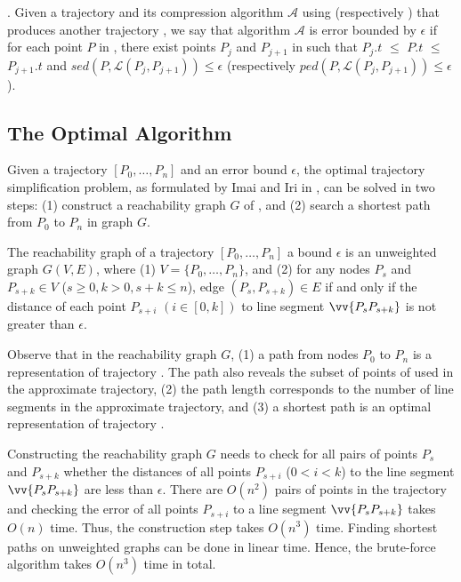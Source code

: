 . Given a trajectory  and its compression  algorithm $\mathcal{A}$ using \sed (respectively \ped) that produces another trajectory ,
we say that algorithm $\mathcal{A}$ is error bounded by $\epsilon$ if  for each point $P$ in , there exist points $P_j$ and $P_{j+1}$ in  such that $P_j.t$ $\le$ $P.t$ $\le$ $P_{j+1}.t$ and $sed(P, \mathcal{L}(P_j,P_{j+1}))\le \epsilon$ (respectively $ped(P, \mathcal{L}(P_j,P_{j+1}))\le \epsilon$).



\subsection{The Optimal \lsa Algorithm}
\label{subsec-optimal}

Given a trajectory ${[P_0, \ldots, P_n]}$ and an error bound $\epsilon$, the optimal trajectory simplification problem, as formulated by Imai and Iri in \cite{Imai:Optimal}, can be solved in two steps: (1) construct a reachability graph $G$ of , and (2) search a shortest path from $P_0$ to $P_{n}$ in graph $G$.

The reachability graph of a trajectory ${[P_0, \ldots, P_n]}$ \wrt a bound $\epsilon$ is an unweighted graph $G(V, E)$, where (1) $V = \{P_0, \ldots, P_n\}$, and (2) for any nodes $P_s$ and $P_{s+k} \in V$ ($s\ge 0, k>0, s+k\le n$), edge $(P_s, P_{s+k}) \in E$ if and only if the distance of each point $P_{s+i}$ $(i\in[0,k])$ to line segment $\vv{P_sP_{s+k}}$ is not greater than $\epsilon$.

Observe that in the reachability graph $G$, (1) a path from nodes $P_0$ to $P_{n}$ is a representation of trajectory . The path also reveals the subset of points of  used in the approximate trajectory, (2) the path length corresponds to the number of line segments in the approximate trajectory, and
(3) a shortest path is an optimal representation of trajectory .

Constructing the reachability graph $G$ needs to check for all pairs of points $P_s$ and $P_{s+k}$ whether the distances of all points $P_{s+i}$  ($0<i<k$) to the line segment $\vv{P_sP_{s+k}}$ are less than $\epsilon$.
There are $O(n^2)$ pairs of points in the trajectory and checking the error of all points $P_{s+i}$ to a line segment $\vv{P_sP_{s+k}}$ takes $O(n)$ time.
Thus, the construction step takes $O(n^3)$ time.
Finding shortest paths on unweighted graphs can be done in linear time. Hence, the brute-force algorithm takes $O(n^3)$ time in total.

